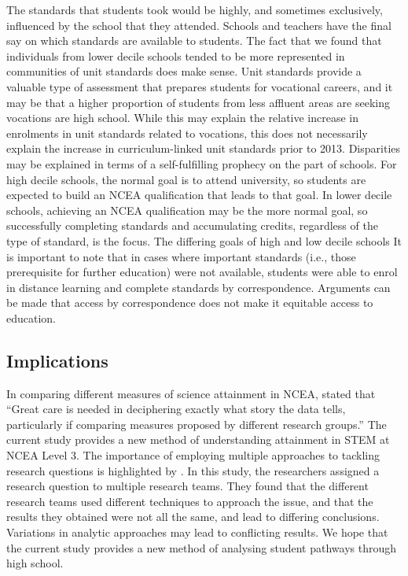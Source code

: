 \documentclass[a4paper]{article}
\begin{document}
The standards that students took would be highly, and sometimes exclusively, influenced by the school that they attended. Schools and teachers have the final say on which standards are available to students. The fact that we found that individuals from lower decile schools tended to be more represented in communities of unit standards does make sense. Unit standards provide a valuable type of assessment that prepares students for vocational careers, and it may be that a higher proportion of students from less affluent areas are seeking vocations are high school. While this may explain the relative increase in enrolments in unit standards related to vocations, this does not necessarily explain the increase in curriculum-linked unit standards prior to 2013. Disparities may be explained in terms of a self-fulfilling prophecy on the part of schools. For high decile schools, the normal goal is to attend university, so students are expected to build an NCEA qualification that leads to that goal. In lower decile schools, achieving an NCEA qualification may be the more normal goal, so successfully completing standards and accumulating credits, regardless of the type of standard, is the focus. The differing goals of high and low decile schools It is important to note that in cases where important standards (i.e., those prerequisite for further education) were not available, students were able to enrol in distance learning and complete  standards by correspondence. Arguments can be made that access by correspondence does not make it equitable access to education. 

\subsection{Implications}
In comparing different measures of science attainment in NCEA, \cite{hipkins2005staying} stated that ``Great care is needed in deciphering exactly what story the data tells, particularly if comparing measures
proposed by different research groups.'' The current study provides a new method of understanding attainment in STEM at NCEA Level 3. The importance of employing multiple approaches to tackling research questions is highlighted by \cite{silberzahn2018many}. In this study, the researchers assigned a research question to multiple research teams. They found that the different research teams used different techniques to approach the issue, and that the results they obtained were not all the same, and lead to differing conclusions. Variations in analytic approaches may lead to conflicting results. We hope that the current study provides a new method of analysing student pathways through high school.
\end{document}
